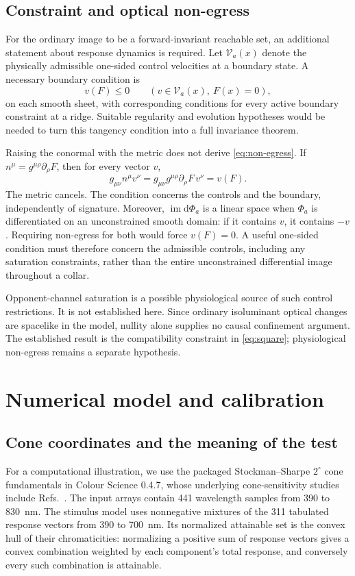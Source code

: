 \documentclass[9pt,twocolumn,twoside]{opticajnl}
\theoremstyle{plain}
\newcommand{\dd}{\mathrm{d}}
\begin{document}
\subsection{Constraint and optical non-egress}
For the ordinary image to be a forward-invariant reachable set, an additional statement about response dynamics is required. Let $\mathcal V_a(x)$ denote the physically admissible one-sided control velocities at a boundary state. A necessary boundary condition is
\begin{equation}
 v(F)\leq0\qquad(v\in\mathcal V_a(x),\ F(x)=0),
 \label{eq:non-egress}
\end{equation}
on each smooth sheet, with corresponding conditions for every active boundary constraint at a ridge. Suitable regularity and evolution hypotheses would be needed to turn this tangency condition into a full invariance theorem.

Raising the conormal with the metric does not derive \eqref{eq:non-egress}. If $n^\mu=g^{\mu\rho}\partial_\rho F$, then for every vector $v$,
\begin{equation}
 g_{\mu\nu}n^\mu v^\nu
 =g_{\mu\nu}g^{\mu\rho}\partial_\rho F\,v^\nu
 =v(F).
 \label{eq:identity}
\end{equation}
The metric cancels. The condition concerns the controls and the boundary, independently of signature. Moreover, $\operatorname{im}\dd\Phi_a$ is a linear space when $\Phi_a$ is differentiated on an unconstrained smooth domain: if it contains $v$, it contains $-v$. Requiring non-egress for both would force $v(F)=0$. A useful one-sided condition must therefore concern the admissible controls, including any saturation constraints, rather than the entire unconstrained differential image throughout a collar.

Opponent-channel saturation is a possible physiological source of such control restrictions. It is not established here. Since ordinary isoluminant optical changes are spacelike in the model, nullity alone supplies no causal confinement argument. The established result is the compatibility constraint in \eqref{eq:square}; physiological non-egress remains a separate hypothesis.

\section{Numerical model and calibration}
\label{sec:numerics}
\subsection{Cone coordinates and the meaning of the test}
\label{sec:identification}
For a computational illustration, we use the packaged Stockman--Sharpe $2^\circ$ cone fundamentals in Colour Science 0.4.7, whose underlying cone-sensitivity studies include Refs.~\cite{Stockman2000,Stockman1999}. The input arrays contain 441 wavelength samples from 390 to 830~nm. The stimulus model uses nonnegative mixtures of the 311 tabulated response vectors from 390 to 700~nm. Its normalized attainable set is the convex hull of their chromaticities: normalizing a positive sum of response vectors gives a convex combination weighted by each component's total response, and conversely every such combination is attainable.
\end{document}
